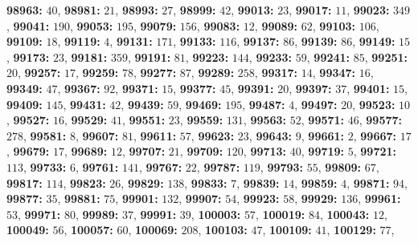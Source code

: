 \textsf{\bfseries 98963:} $40$, \textsf{\bfseries 98981:} $21$, \textsf{\bfseries 98993:} $27$, \textsf{\bfseries 98999:} $42$, \textsf{\bfseries 99013:} $23$, \textsf{\bfseries 99017:} $11$, \textsf{\bfseries 99023:} $349$, \textsf{\bfseries 99041:} $190$, \textsf{\bfseries 99053:} $195$, \textsf{\bfseries 99079:} $156$, \textsf{\bfseries 99083:} $12$, \textsf{\bfseries 99089:} $62$, \textsf{\bfseries 99103:} $106$, \textsf{\bfseries 99109:} $18$, \textsf{\bfseries 99119:} $4$, \textsf{\bfseries 99131:} $171$, \textsf{\bfseries 99133:} $116$, \textsf{\bfseries 99137:} $86$, \textsf{\bfseries 99139:} $86$, \textsf{\bfseries 99149:} $15$, \textsf{\bfseries 99173:} $23$, \textsf{\bfseries 99181:} $359$, \textsf{\bfseries 99191:} $81$, \textsf{\bfseries 99223:} $144$, \textsf{\bfseries 99233:} $59$, \textsf{\bfseries 99241:} $85$, \textsf{\bfseries 99251:} $20$, \textsf{\bfseries 99257:} $17$, \textsf{\bfseries 99259:} $78$, \textsf{\bfseries 99277:} $87$, \textsf{\bfseries 99289:} $258$, \textsf{\bfseries 99317:} $14$, \textsf{\bfseries 99347:} $16$, \textsf{\bfseries 99349:} $47$, \textsf{\bfseries 99367:} $92$, \textsf{\bfseries 99371:} $15$, \textsf{\bfseries 99377:} $45$, \textsf{\bfseries 99391:} $20$, \textsf{\bfseries 99397:} $37$, \textsf{\bfseries 99401:} $15$, \textsf{\bfseries 99409:} $145$, \textsf{\bfseries 99431:} $42$, \textsf{\bfseries 99439:} $59$, \textsf{\bfseries 99469:} $195$, \textsf{\bfseries 99487:} $4$, \textsf{\bfseries 99497:} $20$, \textsf{\bfseries 99523:} $10$, \textsf{\bfseries 99527:} $16$, \textsf{\bfseries 99529:} $41$, \textsf{\bfseries 99551:} $23$, \textsf{\bfseries 99559:} $131$, \textsf{\bfseries 99563:} $52$, \textsf{\bfseries 99571:} $46$, \textsf{\bfseries 99577:} $278$, \textsf{\bfseries 99581:} $8$, \textsf{\bfseries 99607:} $81$, \textsf{\bfseries 99611:} $57$, \textsf{\bfseries 99623:} $23$, \textsf{\bfseries 99643:} $9$, \textsf{\bfseries 99661:} $2$, \textsf{\bfseries 99667:} $17$, \textsf{\bfseries 99679:} $17$, \textsf{\bfseries 99689:} $12$, \textsf{\bfseries 99707:} $21$, \textsf{\bfseries 99709:} $120$, \textsf{\bfseries 99713:} $40$, \textsf{\bfseries 99719:} $5$, \textsf{\bfseries 99721:} $113$, \textsf{\bfseries 99733:} $6$, \textsf{\bfseries 99761:} $141$, \textsf{\bfseries 99767:} $22$, \textsf{\bfseries 99787:} $119$, \textsf{\bfseries 99793:} $55$, \textsf{\bfseries 99809:} $67$, \textsf{\bfseries 99817:} $114$, \textsf{\bfseries 99823:} $26$, \textsf{\bfseries 99829:} $138$, \textsf{\bfseries 99833:} $7$, \textsf{\bfseries 99839:} $14$, \textsf{\bfseries 99859:} $4$, \textsf{\bfseries 99871:} $94$, \textsf{\bfseries 99877:} $35$, \textsf{\bfseries 99881:} $75$, \textsf{\bfseries 99901:} $132$, \textsf{\bfseries 99907:} $54$, \textsf{\bfseries 99923:} $58$, \textsf{\bfseries 99929:} $136$, \textsf{\bfseries 99961:} $53$, \textsf{\bfseries 99971:} $80$, \textsf{\bfseries 99989:} $37$, \textsf{\bfseries 99991:} $39$, \textsf{\bfseries 100003:} $57$, \textsf{\bfseries 100019:} $84$, \textsf{\bfseries 100043:} $12$, \textsf{\bfseries 100049:} $56$, \textsf{\bfseries 100057:} $60$, \textsf{\bfseries 100069:} $208$, \textsf{\bfseries 100103:} $47$, \textsf{\bfseries 100109:} $41$, \textsf{\bfseries 100129:} $77$, 
